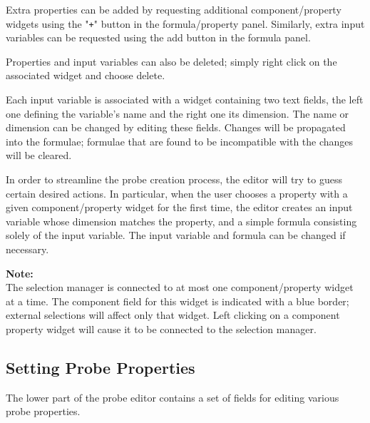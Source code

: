 \documentclass{article}
\begin{document}
Extra properties can be added by requesting additional
component/property widgets using the "{\tt +}" button in the
formula/property panel. Similarly, extra input variables can be
requested using the add button in the formula panel.

Properties and input variables can also be deleted; simply right
click on the associated widget and choose {\sf delete}.

Each input variable is associated with a widget containing two text
fields, the left one defining the variable's name and the right one
its dimension.  The name or dimension can be changed by editing these
fields. Changes will be propagated into the formulae; formulae that
are found to be incompatible with the changes will be cleared.

In order to streamline the probe creation process, the editor will try
to guess certain desired actions.  In particular, when the user
chooses a property with a given component/property widget for the
first time, the editor creates an input variable whose dimension
matches the property, and a simple formula consisting solely
of the input variable. The input variable and formula can be changed if
necessary.

\begin{sideblock}
{\bf Note:}\\
The selection manager is connected to at most one
component/property widget at a time. The component field for this
widget is indicated with a blue border; external selections will
affect only that widget. Left clicking on a component property widget
will cause it to be connected to the selection manager.
\end{sideblock}

\subsection{Setting Probe Properties}
\label{settingProbePropertiesSec}

The lower part of the probe editor contains a set of fields for
editing various probe properties.
\end{document}
